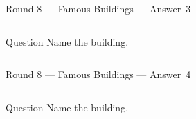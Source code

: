 \documentclass[11pt,draft]{beamer}
\begin{document}
\begin{frame}[t]{Round 8 --- Famous Buildings --- \mbox{Answer 3}}
    \begin{columns}[T,totalwidth=\linewidth]
        \begin{column}{0.32\linewidth}
            \begin{block}{Question}
                Name the building.
            \end{block}
        \end{column}
        \begin{column}{0.65\linewidth}
            \begin{center}
                \texttt{[image: \{Images/pantheonparis]}.jpeg}
            \end{center}
        \end{column}
    \end{columns}
\end{frame}
\begin{frame}[t]{Round 8 --- Famous Buildings --- \mbox{Answer 4}}
    \begin{columns}[T,totalwidth=\linewidth]
        \begin{column}{0.32\linewidth}
            \begin{block}{Question}
                Name the building.
            \end{block}
        \end{column}
        \begin{column}{0.65\linewidth}
            \begin{center}
                \texttt{[image: \{Images/pantheonrome]}.jpg}
            \end{center}
        \end{column}
    \end{columns}
\end{frame}
\end{document}
